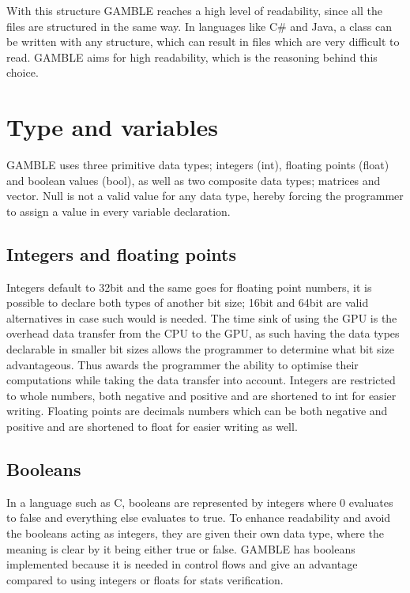 With this structure GAMBLE reaches a high level of readability, since all the files are structured in the same way.
In languages like C\# and Java, a class can be written with any structure, which can result in files which are very difficult to read.
GAMBLE aims for high readability, which is the reasoning behind this choice.

\section{Type and variables} \label{sec:Types}
GAMBLE uses three primitive data types; integers (int), floating points (float) and boolean values (bool), as well as two composite data types; matrices and vector. 
Null is not a valid value for any data type, hereby forcing the programmer to assign a value in every variable declaration.

\subsection*{Integers and floating points}
Integers default to 32bit and the same goes for floating point numbers, it is possible to declare both types of another bit size; 16bit and 64bit are valid alternatives in case such would is needed.
The time sink of using the GPU is the overhead data transfer from the CPU to the GPU, as such having the data types declarable in smaller bit sizes allows the programmer to determine what bit size advantageous.
Thus awards the programmer the ability to optimise their computations while taking the data transfer into account.
Integers are restricted to whole numbers, both negative and positive and are shortened to int for easier writing.
Floating points are decimals numbers which can be both negative and positive and are shortened to float for easier writing as well.

\subsection*{Booleans}
In a language such as C, booleans are represented by integers where 0 evaluates to false and everything else evaluates to true.
To enhance readability and avoid the booleans acting as integers, they are given their own data type, where the meaning is clear by it being either true or false.
GAMBLE has booleans implemented because it is needed in control flows and give an advantage compared to using integers or floats for stats verification.   

